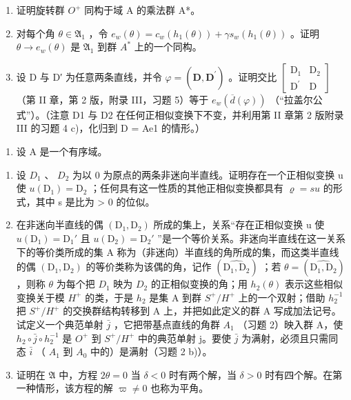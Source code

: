 \begin{enumerate}
\def\labelenumi{\alph{enumi})}
\item
  证明旋转群 \(O^{+}\) 同构于域 A 的乘法群 A*。
\item
  对每个角 \(\theta \in \mathfrak{A}_1\) ，令 \(e_w(\theta) = c_w(h_1(\theta)) + \gamma s_w(h_1(\theta))\) 。证明 \(\theta \to e_w(\theta)\) 是 \(\mathfrak{A}_1\) 到群 \(A^*\) 上的一个同构。
\item
  设 D 与 D′ 为任意两条直线，并令 \(\varphi = (\widehat{\mathbf{D},\mathbf{D}^{\prime}})\) 。证明交比 \(\left[ \begin{array}{cc}\mathrm{D}_{1} & \mathrm{D}_{2}\\ \mathrm{D}^{\prime} & \mathrm{D} \end{array} \right]\) （第 II 章，第 2 版，附录 III，习题 5）等于 \(e_w(\overline{d} (\varphi))\) （“拉盖尔公式”）。（注意 D1 与 D2 在任何正相似变换下不变，并利用第 II 章第 2 版附录 III 的习题 4 c)，化归到 D = Ae1 的情形。）
\end{enumerate}

\begin{enumerate}
\def\labelenumi{\arabic{enumi})}
\setcounter{enumi}{5}
\tightlist
\item
  设 A 是一个有序域。
\end{enumerate}

\begin{enumerate}
\def\labelenumi{\alph{enumi})}
\item
  设 \(D_{1}\) 、 \(D_{2}\) 为以 0 为原点的两条非迷向半直线。证明存在一个正相似变换 u 使 \(u(\mathrm{D}_{1}) = \mathrm{D}_{2}\) ；任何具有这一性质的其他正相似变换都具有 \(\varrho = su\) 的形式，其中 s 是比为 \textgreater{} 0 的位似。
\item
  在非迷向半直线的偶 \((\mathrm{D}_{1}, \mathrm{D}_{2})\) 所成的集上，关系“存在正相似变换 u 使 \(u(\mathrm{D}_{1}) = \mathrm{D}_{1}'\) 且 \(u(\mathrm{D}_{2}) = \mathrm{D}_{2}'\) ”是一个等价关系。非迷向半直线在这一关系下的等价类所成的集 A 称为（非迷向）半直线的角所成的集，而这类半直线的偶 \((\mathrm{D}_{1}, \mathrm{D}_{2})\) 的等价类称为该偶的角，记作 \((\widehat{\mathrm{D}_{1}, \mathrm{D}_{2}})\) ；若 \(\theta = (\widehat{\mathrm{D}_{1}, \mathrm{D}_{2}})\) ，则称 \(\theta\) 为每个把 \(D_{1}\) 映为 \(D_{2}\) 的正相似变换的角；用 \(h_{2}(\theta)\) 表示这些相似变换关于模 \(H^{+}\) 的类，于是 \(h_{2}\) 是集 A 到群 \(S^{+}/H^{+}\) 上的一个双射；借助 \(h_{2}^{-1}\) 把 \(S^{+}/H^{+}\) 的交换群结构转移到 A 上，并把如此定义的群 A 写成加法记号。试定义一个典范单射 \(\bar{j}\) ，它把带基点直线的角群 \(A_{1}\) （习题 2）映入群 A，使 \(h_{2} \circ \bar{j} \circ h_{2}^{-1}\) 是 \(O^{+}\) 到 \(S^{+}/H^{+}\) 中的典范单射 j。要使 \(\bar{j}\) 为满射，必须且只需同态 \(\bar{i}\) （ \(A_{1}\) 到 \(A_{0}\) 中的）是满射（习题 2 b)）。
\item
  证明在 \(\mathfrak{A}\) 中，方程 \(2\theta = 0\) 当 \(\delta < 0\) 时有两个解，当 \(\delta > 0\) 时有四个解。在第一种情形，该方程的解 \(\varpi \neq 0\) 也称为平角。
\end{enumerate}

